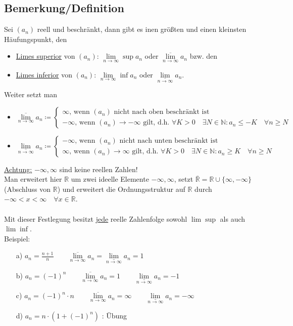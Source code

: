 \documentclass[12pt, titlepage]{article}
\newcommand{\R}{\mathds{R}}
\newcommand{\N}{\mathds{N}}
\newcommand{\infn}{n\rightarrow\infty}
\newcommand{\limsuperior}[1]{\lim\limits_{#1}\sup}
\newcommand{\liminferior}[1]{\lim\limits_{#1}\inf}
\renewcommand{\*}{\cdot}
\renewcommand{\limsup}[1]{\underset{#1}{\overline{\lim}}}
\renewcommand{\liminf}[1]{\underset{#1}{\underline{\lim}}}
\begin{document}
	\subsection{Bemerkung/Definition}
	Sei $(a_n)$ reell und beschränkt, dann gibt es inen größten und einen kleinsten Häufungspunkt, den
	\begin{itemize}
		\item \underline{Limes superior} von $(a_n)$: $\limsuperior{\infn}a_n$ oder $\limsup{\infn}a_n$ bzw. den
		\item \underline{Limes inferior} von $(a_n)$: $\liminferior{\infn}a_n$ oder $\liminf{\infn}a_n$.
	\end{itemize}
	Weiter setzt man
	\begin{itemize}
		\item $\limsup{\infn}a_n\coloneqq\begin{cases}
			\infty\textrm{, wenn }(a_n)\textrm{ nicht nach oben beschränkt ist}\\
			-\infty\textrm{, wenn }(a_n)\rightarrow-\infty\textrm{ gilt, d.h. }\forall K>0\quad\exists N\in\N\colon a_n\leq-K\quad\forall n\geq N 
		\end{cases}$
		\item $\liminf{\infn}a_n\coloneqq\begin{cases}
		-\infty\textrm{, wenn }(a_n)\textrm{ nicht nach unten beschränkt ist}\\
		\infty\textrm{, wenn }(a_n)\rightarrow\infty\textrm{ gilt, d.h. }\forall K>0\quad\exists N\in\N\colon a_n\geq K\quad\forall n\geq N
		\end{cases}$
	\end{itemize}
	\underline{Achtung:} $-\infty,\infty$ sind keine reellen Zahlen!\\
	Man erweitert hier $\R$ um zwei ideelle Elemente $-\infty,\infty$, setzt $\overline{\R}=\R\cup\{\infty,-\infty\}$ (Abschluss von $\R$) und erweitert die Ordnungsstruktur auf $\R$ durch\\ $-\infty<x<\infty\quad\forall x\in\R$.\\
	\\
	Mit dieser Festlegung besitzt \underline{jede} reelle Zahlenfolge sowohl $\limsuperior{}$ als auch $\liminferior{}$.\\
	Beispiel:
	\begin{itemize}
		\item[a)] $a_n=\frac{n+1}{n}\qquad\limsup{\infn}a_n=\liminf{\infn}a_n=1$
		\item[b)] $a_n=(-1)^n\qquad\limsup{\infn}a_n=1\qquad\liminf{\infn}a_n=-1$
		\item[c)] $a_n=(-1)^n\*n\qquad\limsup{\infn}a_n=\infty\qquad\liminf{\infn}a_n=-\infty$
		\item[d)] $a_n=n\*(1+(-1)^n)$ : Übung
	\end{itemize}
\end{document}
